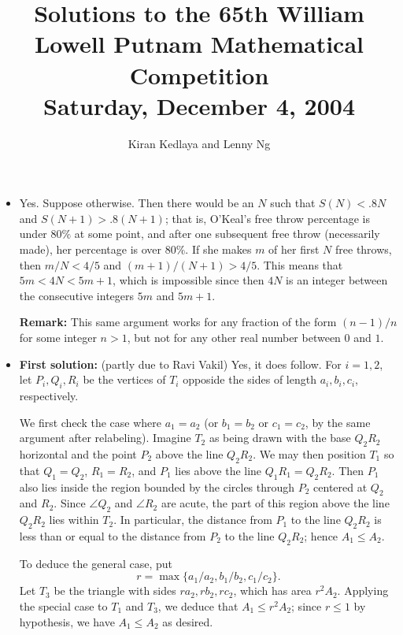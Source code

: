 \documentclass[amssymb,twocolumn,pra,10pt,aps]{revtex4-1}
\begin{document}
\title{Solutions to the 65th William Lowell Putnam Mathematical Competition \\
    Saturday, December 4, 2004}
\author{Kiran Kedlaya and Lenny Ng}
\noaffiliation
\maketitle

\begin{itemize}

\item[A1]
Yes. Suppose otherwise. Then there would be an $N$ such that $S(N) < .8N$
and $S(N+1) > .8(N+1)$; that is, O'Keal's free throw percentage is under $80\%$
at some point, and after one subsequent free throw (necessarily made),
her percentage is over $80\%$. If she makes $m$ of her first $N$ free
throws, then $m/N < 4/5$ and $(m+1)/(N+1) > 4/5$. This means that $5m <
4N < 5m+1$, which is impossible since then $4N$ is an integer between the
consecutive integers $5m$ and $5m+1$.

\textbf{Remark:}
This same argument works for any fraction of the form
$(n-1)/n$ for some integer $n>1$, but not for any other real number
between $0$ and $1$.

\item[A2]
\textbf{First solution:} (partly due to Ravi Vakil)
Yes, it does follow.
For $i=1,2$,
let $P_i, Q_i, R_i$ be the vertices of $T_i$ opposide the sides of length
$a_i, b_i, c_i$, respectively.

We first check the case where $a_1 = a_2$ (or $b_1 = b_2$ or $c_1 = c_2$,
by the same argument after relabeling).
Imagine $T_2$ as being drawn with the base $Q_2R_2$
horizontal and the point $P_2$ above the line $Q_2R_2$. We may then
position $T_1$ so that $Q_1 = Q_2$, $R_1 = R_2$, and $P_1$ lies above the line
$Q_1R_1 = Q_2R_2$. Then $P_1$ also lies inside the region bounded by the
circles through $P_2$ centered at $Q_2$ and $R_2$. Since $\angle Q_2$
and $\angle R_2$ are acute, the part of this region above the line
$Q_2R_2$ lies within $T_2$. In particular, the
distance from $P_1$ to the line $Q_2R_2$ is less than or equal to the
distance from $P_2$ to the line $Q_2R_2$; hence $A_1 \leq A_2$.

To deduce the general case, put
\[
r = \max\{a_1/a_2, b_1/b_2, c_1/c_2\}.
\]
Let $T_3$ be the triangle with sides $ra_2, rb_2, rc_2$, which
has area $r^2 A_2$. Applying the special case to $T_1$ and $T_3$,
we deduce that $A_1 \leq r^2 A_2$; since $r \leq 1$ by hypothesis,
we have $A_1 \leq A_2$ as desired.


\end{itemize}
\end{document}
